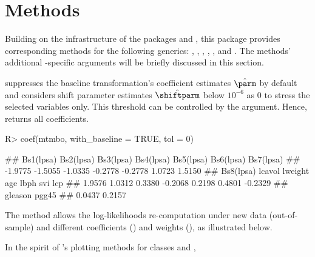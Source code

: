 \section{\texorpdfstring{}{S3} Methods} \label{sec:methods}

Building on the  infrastructure of the packages  and ,
this package provides corresponding methods for the following generics: ,
, , , , and .
The methods' additional -specific arguments will be briefly discussed
in this section.

 suppresses the baseline transformation's coefficient estimates
$\hat\parm$ by default and considers shift parameter estimates $\hat\shiftparm$
below $10^{-6}$ as $0$ to stress the selected variables only.
This threshold can be controlled by the  argument.
Hence,  returns all coefficients.
\begin{example}
R> coef(mtmbo, with_baseline = TRUE, tol = 0)

## Bs1(lpsa) Bs2(lpsa) Bs3(lpsa) Bs4(lpsa) Bs5(lpsa) Bs6(lpsa) Bs7(lpsa) 
##   -1.9775   -1.5055   -1.0335   -0.2778   -0.2778    1.0723    1.5150 
## Bs8(lpsa)    lcavol   lweight       age      lbph       svi       lcp 
##    1.9576    1.0312    0.3380   -0.2068    0.2198    0.4801   -0.2329 
## gleason     pgg45 
##    0.0437    0.2157 
\end{example}
The  method allows the log-likelihoods re-computation under
new data (\ie out-of-sample) and different coefficients () and weights
(), as illustrated below.
In the spirit of 's plotting methods for classes  and ,
